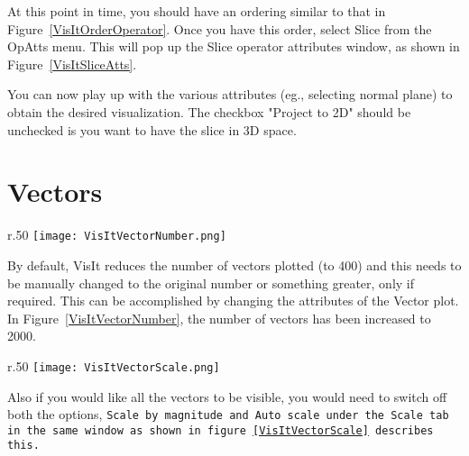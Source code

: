 At this point in time, you should have an ordering similar to that in
Figure~\ref{VisItOrderOperator}.  Once you have this order, select
Slice from the OpAtts menu. This will pop up the Slice operator
attributes window, as shown in Figure~\ref{VisItSliceAtts}.


You can now play up with the various attributes (eg., selecting normal
plane) to obtain the desired visualization. The checkbox "Project to
2D" should be unchecked is you want to have the slice in 3D space.

\section{Vectors}

\begin{wrapfigure}{r}{.50\textwidth}
  \center
  \vspace{-40pts}
  \texttt{[image: VisItVectorNumber.png]}
  \caption{Increasing the number of Vectors}
  \vspace{-20pts}
  \label{VisItVectorNumber}
\end{wrapfigure}


By default, VisIt reduces the number of vectors plotted (to 400) and
this needs to be manually changed to the original number or something
greater, only if required.  This can be accomplished by changing the
attributes of the Vector plot. In Figure~\ref{VisItVectorNumber}, the
number of vectors has been increased to 2000.


\begin{wrapfigure}{r}{.50\textwidth}
  \center
  \vspace{-50pts}
  \texttt{[image: VisItVectorScale.png]}
  \caption{Increasing the scale of Vectors}
  \vspace{-30pts}
  \label{VisItVectorScale}
\end{wrapfigure}


Also if you would like all the vectors to be visible, you would need
to switch off both the options, \tt Scale by magnitude \normalfont and
\tt Auto scale \normalfont under the Scale tab in the same window as
shown in figure~\ref{VisItVectorScale} describes this.


